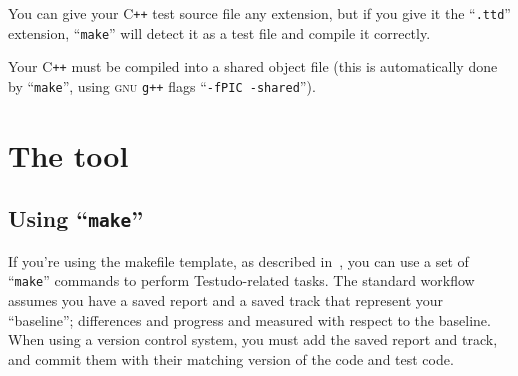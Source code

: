 \documentclass[twoside, a4paper, article]{memoir}
\newcommand*\Cpp{C\texttt{++}}
\begin{document}
You can give your \Cpp{} test source file any extension, but if you give it the
``\texttt{.ttd}'' extension, ``\texttt{make}'' will detect it as a test file
and compile it correctly.

Your \Cpp{} must be compiled into a shared object file (this is automatically
done by ``\texttt{make}'', using \textsc{gnu} \texttt{g++} flags
``\texttt{-fPIC -shared}'').

\section{The tool}

\subsection{Using ``\texttt{make}''}
\label{sec:using-make}

If you're using the makefile template, as described
in~, you can use a set of ``\texttt{make}''
commands to perform Testudo-related tasks.  The standard workflow assumes you
have a saved report and a saved track that represent your ``baseline'';
differences and progress and measured with respect to the baseline.  When using
a version control system, you must add the saved report and track, and commit
them with their matching version of the code and test code.
\end{document}
